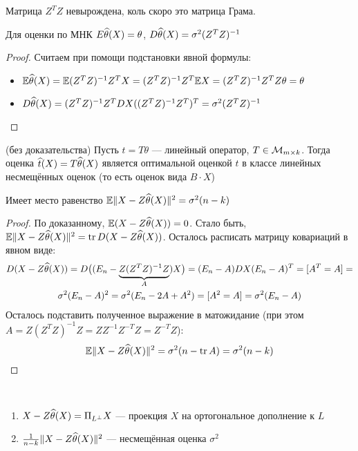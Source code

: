 \begin{note}
	Матрица $Z^TZ$ невырождена, коль скоро это матрица Грама.
\end{note}

\begin{proposition}
	Для оценки по МНК $E \widehat{\theta}(X) = \theta$, $D \widehat{\theta}(X) = \sigma^2(Z^TZ)^{-1}$
\end{proposition}

\begin{proof}
	Считаем при помощи подстановки явной формулы:
	\begin{itemize}
		\item $\mathbb{E} \widehat{\theta}(X) = \mathbb{E} (Z^TZ)^{-1}Z^TX = (Z^TZ)^{-1}Z^T\mathbb{E} X = (Z^TZ)^{-1}Z^TZ\theta = \theta$
		
		\item $D \widehat{\theta}(X) = (Z^TZ)^{-1}Z^T DX ((Z^TZ)^{-1}Z^T)^T = \sigma^2(Z^TZ)^{-1}$
	\end{itemize}
\end{proof}

\begin{theorem} (без доказательства)
	Пусть $t = T\theta$ --- линейный оператор, $T \in \mathcal{M}_{m \times k}$. Тогда оценка $\widehat{t}(X) = T\widehat{\theta}(X)$ является оптимальной оценкой $t$ в классе линейных несмещённых оценок (то есть оценок вида $B \cdot X$)
\end{theorem}

\begin{lemma}
	Имеет место равенство $\mathbb{E} \|X - Z\widehat{\theta}(X)\|^2 = \sigma^2(n - k)$
\end{lemma}

\begin{proof}
	По доказанному, $\mathbb{E} (X - Z\widehat{\theta}(X)) = 0$. Стало быть, $\mathbb{E} \|X - Z\widehat{\theta}(X)\|^2 = \operatorname{tr} D(X - Z\widehat{\theta}(X))$. Осталось расписать матрицу ковариаций в явном виде:
	\begin{multline*}
		D(X - Z\widehat{\theta}(X)) = D\big((E_n - \underbrace{Z(Z^TZ)^{-1}Z}_{A})X\big) = (E_n - A) DX (E_n - A)^T = [A^T = A] =
		\\
		\sigma^2 (E_n - A)^2 = \sigma^2(E_n - 2A + A^2) = [A^2 = A] = \sigma^2(E_n - A)
	\end{multline*}
	Осталось подставить полученное выражение в матожидание (при этом $A = Z(Z^TZ)^{-1}Z = ZZ^{-1}Z^{-T}Z = Z^{-T}Z$):
	\[
		\mathbb{E} \|X - Z\widehat{\theta}(X)\|^2 = \sigma^2(n - \operatorname{tr} A) = \sigma^2(n - k)
	\]
\end{proof}

\begin{corollary}~
	\begin{enumerate}
		\item $X - Z\widehat{\theta}(X) = \Pi_{L^\bot} X$ --- проекция $X$ на ортогональное дополнение к $L$
		
		\item $\frac{1}{n - k} \|X - Z\widehat{\theta}(X)\|^2$ --- несмещённая оценка $\sigma^2$
	\end{enumerate}
\end{corollary}

